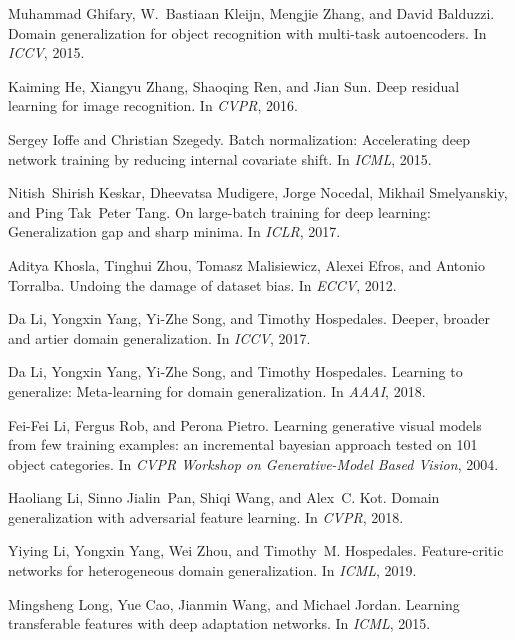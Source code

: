 \documentclass[10pt,twocolumn,letterpaper]{article}
\begin{document}
{\begin{thebibliography}{10}
Muhammad Ghifary, W.~Bastiaan Kleijn, Mengjie Zhang, and David Balduzzi.
\newblock Domain generalization for object recognition with multi-task
  autoencoders.
\newblock In {\em ICCV}, 2015.

Kaiming He, Xiangyu Zhang, Shaoqing Ren, and Jian Sun.
\newblock Deep residual learning for image recognition.
\newblock In {\em CVPR}, 2016.

Sergey Ioffe and Christian Szegedy.
\newblock Batch normalization: Accelerating deep network training by reducing
  internal covariate shift.
\newblock In {\em ICML}, 2015.

Nitish~Shirish Keskar, Dheevatsa Mudigere, Jorge Nocedal, Mikhail Smelyanskiy,
  and Ping Tak~Peter Tang.
\newblock On large-batch training for deep learning: Generalization gap and
  sharp minima.
\newblock In {\em ICLR}, 2017.

Aditya Khosla, Tinghui Zhou, Tomasz Malisiewicz, Alexei Efros, and Antonio
  Torralba.
\newblock Undoing the damage of dataset bias.
\newblock In {\em ECCV}, 2012.

Da Li, Yongxin Yang, Yi-Zhe Song, and Timothy Hospedales.
\newblock Deeper, broader and artier domain generalization.
\newblock In {\em ICCV}, 2017.

Da Li, Yongxin Yang, Yi-Zhe Song, and Timothy Hospedales.
\newblock Learning to generalize: Meta-learning for domain generalization.
\newblock In {\em AAAI}, 2018.

Fei-Fei Li, Fergus Rob, and Perona Pietro.
\newblock Learning generative visual models from few training examples: an
  incremental bayesian approach tested on 101 object categories.
\newblock In {\em CVPR Workshop on Generative-Model Based Vision}, 2004.

Haoliang Li, Sinno Jialin~Pan, Shiqi Wang, and Alex~C. Kot.
\newblock Domain generalization with adversarial feature learning.
\newblock In {\em CVPR}, 2018.

Yiying Li, Yongxin Yang, Wei Zhou, and Timothy~M. Hospedales.
\newblock Feature-critic networks for heterogeneous domain generalization.
\newblock In {\em ICML}, 2019.

Mingsheng Long, Yue Cao, Jianmin Wang, and Michael Jordan.
\newblock Learning transferable features with deep adaptation networks.
\newblock In {\em ICML}, 2015.


\end{thebibliography}}
\end{document}
